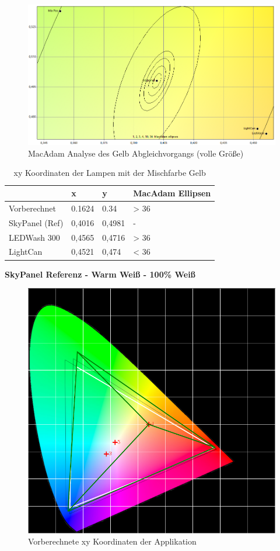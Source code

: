 \documentclass[11pt]{scrartcl}
\begin{document}
\begin{figure}[H]
    \begin{center}
        \includegraphics[width=\textwidth]{images/macAdam/comparedYellow.png}
    \end{center}
    \caption{MacAdam Analyse des Gelb Abgleichvorgangs (volle Größe)}
\end{figure}
\noindent
\begin{table}[H]
    \begin{tabularx}{\textwidth}{|X|X|X|X|}
        \hline           & x        & y        & MacAdam Ellipsen\\\hline
        Vorberechnet     & 0.1624   & 0.34     & > 36\\\hline
        SkyPanel (Ref)   & 0,4016   & 0,4981   & -\\\hline
        LEDWash 300      & 0,4565   & 0,4716   & > 36\\\hline
        LightCan         & 0,4521   & 0,474    & < 36\\\hline
    \end{tabularx}
    \caption{xy Koordinaten der Lampen mit der Mischfarbe Gelb}
\end{table}
\clearpage
\textbf{SkyPanel Referenz - Warm Weiß - 100\% Weiß}
\begin{figure}[H]
    \begin{center}
        \includegraphics[width=.8\textwidth]{images/app_mix_warmWhite_cie.png}
    \end{center}
    \caption{Vorberechnete xy Koordinaten der Applikation}
\end{figure}
\end{document}
